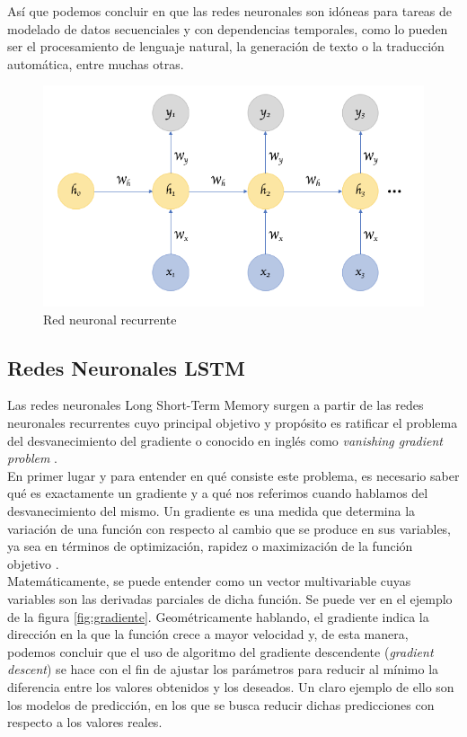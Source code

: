 Así que podemos concluir en que las redes neuronales son idóneas para tareas de modelado de datos secuenciales y con dependencias temporales, como lo pueden ser el procesamiento de lenguaje natural, la generación de texto o la traducción automática, entre muchas otras.
\begin{figure}[h]
	\centering
	\includegraphics[width = 1 \textwidth]{Imagenes/Vectorial/recurrente.png}
	\caption{Red neuronal recurrente \citep{rnn}}
	\label{fig:rnn}
\end{figure}


\subsection{Redes Neuronales LSTM} 

Las redes neuronales Long Short-Term Memory surgen a partir de las redes neuronales recurrentes cuyo principal objetivo y propósito es ratificar el problema del desvanecimiento del gradiente o conocido en inglés como \textit{vanishing gradient problem} \citep{hochreiter1997long}. \\

En primer lugar y para entender en qué consiste este problema, es necesario saber qué es exactamente un gradiente y a qué nos referimos cuando hablamos del desvanecimiento del mismo. Un gradiente es una medida que determina la variación de una función con respecto al cambio que se produce en sus variables, ya sea en términos de optimización, rapidez o maximización de la función objetivo \citep{gradiente}. \\

Matemáticamente, se puede entender como un vector multivariable cuyas variables son las derivadas parciales de dicha función. Se puede ver en el ejemplo de la figura \ref{fig:gradiente}. Geométricamente hablando, el gradiente indica la dirección en la que la función crece a mayor velocidad y, de esta manera, podemos concluir que el uso de algoritmo del  gradiente descendente (\textit{gradient descent}) se hace con el fin de ajustar los parámetros para reducir al mínimo la diferencia entre los valores obtenidos y los deseados. Un claro ejemplo de ello son los modelos de predicción, en los que se busca reducir dichas predicciones con respecto a los valores reales. \\

